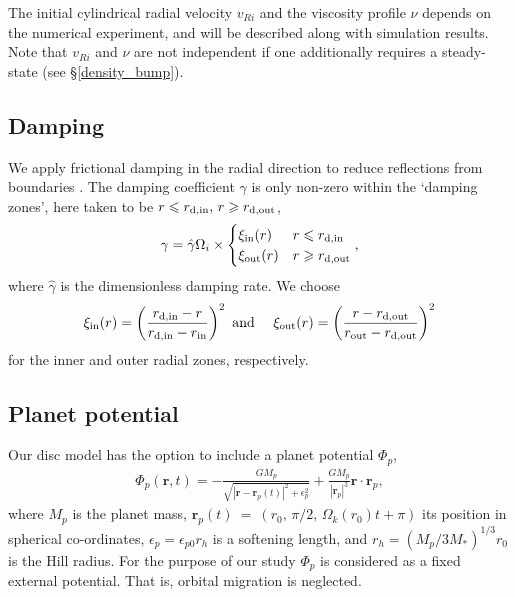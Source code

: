 The initial cylindrical radial velocity $v_{Ri}$ and the viscosity
profile $\nu$ depends on the numerical experiment, and will be
described along with simulation results. Note that $v_{Ri}$ and $\nu$
are not independent if one additionally requires a steady-state (see
\S\ref{density_bump}).    

\subsection{Damping}
We apply frictional damping in the radial direction to reduce
reflections from boundaries \citep[e.g.][]{bate02,valborro07}.  The
damping coefficient $\gamma$ is only  non-zero within the `damping
zones', here taken to be $r\leqslant r_\mathrm{d,in},\,  
r\geqslant r_\mathrm{d,out}$, 
\begin{align}
  \gamma = \hat{\gamma}\Omega_i\times
  \begin{cases}
    \xi_\mathrm{in}(r) & r\leqslant r_\mathrm{d,in} \\
    \xi_\mathrm{out}(r) & r\geqslant r_\mathrm{d,out} \\
  \end{cases},
\end{align}
where $\hat{\gamma}$ is the dimensionless damping rate. We choose
\begin{align}
  \xi_\mathrm{in}(r) = \left(\frac{r_\mathrm{d,in} - r}{r_\mathrm{d,in} - r_\mathrm{in}}\right)^2 \text{ and } \quad
  \xi_\mathrm{out}(r) = \left(\frac{r - r_\mathrm{d,out}}{r_\mathrm{out}- r_\mathrm{d,out}}\right)^2
\end{align}
for the inner and outer radial zones, respectively. 

\subsection{Planet potential}\label{planet}
Our disc model has the option to include a planet potential $\Phi_p$,
\begin{align}
  \Phi_p(\bm{r},t) = -\frac{GM_p}{\sqrt{|\bm{r}-\bm{r}_p(t)|^2 +
      \epsilon^2_p}} + \frac{GM_p}{|\bm{r}_p|^3}\bm{r}\cdot\bm{r}_p,
\end{align}
where $M_p$ is the planet mass,
$\bm{r}_p(t)~=~(r_0,\,\pi/2,\,\Omega_k(r_0)t+\pi)$ its position in
spherical co-ordinates, $\epsilon_p = \epsilon_{p0}r_h$ is a
softening length, and $r_h=(M_p/3M_*)^{1/3}r_0$ is the Hill radius. 
For the purpose of our study $\Phi_p$ is considered as a 
fixed external potential. That is, orbital migration is neglected. 

